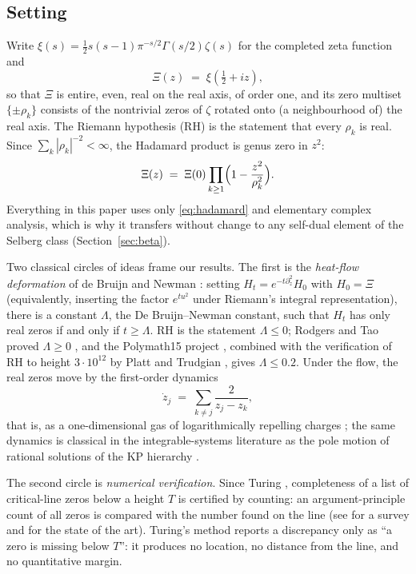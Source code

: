 \documentclass[11pt]{amsart}
\theoremstyle{remark}
\begin{document}
\subsection{Setting}
Write $\xi(s)=\tfrac12 s(s-1)\pi^{-s/2}\Gamma(s/2)\zeta(s)$ for the completed zeta function and
\[
\Xi(z) \;=\; \xi\!\left(\tfrac12+iz\right),
\]
so that $\Xi$ is entire, even, real on the real axis, of order one, and its zero multiset $\{\pm\rho_k\}$ consists of the nontrivial zeros of $\zeta$ rotated onto (a neighbourhood of) the real axis. The Riemann hypothesis (RH) is the statement that every $\rho_k$ is real. Since $\sum_k |\rho_k|^{-2}<\infty$, the Hadamard product is genus zero in $z^2$:
\begin{equation}\label{eq:hadamard}
\Xi(z) \;=\; \Xi(0)\prod_{k\ge 1}\Bigl(1-\frac{z^2}{\rho_k^2}\Bigr).
\end{equation}
Everything in this paper uses only \eqref{eq:hadamard} and elementary complex analysis, which is why it transfers without change to any self-dual element of the Selberg class (Section~\ref{sec:beta}).

Two classical circles of ideas frame our results. The first is the \emph{heat-flow deformation} of de Bruijn \cite{deBruijn} and Newman \cite{Newman}: setting $H_t=e^{-t\partial_z^2}H_0$ with $H_0=\Xi$ (equivalently, inserting the factor $e^{tu^2}$ under Riemann's integral representation), there is a constant $\Lambda$, the De Bruijn--Newman constant, such that $H_t$ has only real zeros if and only if $t\ge\Lambda$. RH is the statement $\Lambda\le 0$; Rodgers and Tao proved $\Lambda\ge 0$ \cite{RT}, and the Polymath15 project \cite{Polymath15}, combined with the verification of RH to height $3\cdot 10^{12}$ by Platt and Trudgian \cite{PT}, gives $\Lambda\le 0.2$. Under the flow, the real zeros move by the first-order dynamics
\begin{equation}\label{eq:coulomb}
\dot z_j \;=\; \sum_{k\ne j}\frac{2}{z_j-z_k},
\end{equation}
that is, as a one-dimensional gas of logarithmically repelling charges \cite[Theorem 11]{RT}; the same dynamics is classical in the integrable-systems literature as the pole motion of rational solutions of the KP hierarchy \cite{AMM,Moser,KKS}.

The second circle is \emph{numerical verification}. Since Turing \cite{Turing}, completeness of a list of critical-line zeros below a height $T$ is certified by counting: an argument-principle count of all zeros is compared with the number found on the line (see \cite{Booker} for a survey and \cite{PT,Platt} for the state of the art). Turing's method reports a discrepancy only as ``a zero is missing below $T$'': it produces no location, no distance from the line, and no quantitative margin.
\end{document}
